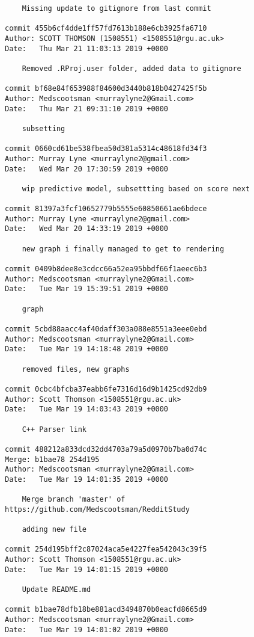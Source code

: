 \begin{lstlisting}
    Missing update to gitignore from last commit

commit 455b6cf4dde1ff57fd7613b188e6cb3925fa6710
Author: SCOTT THOMSON (1508551) <1508551@rgu.ac.uk>
Date:   Thu Mar 21 11:03:13 2019 +0000

    Removed .RProj.user folder, added data to gitignore

commit bf68e84f653988f84600d3440b818b0427425f5b
Author: Medscootsman <murraylyne2@Gmail.com>
Date:   Thu Mar 21 09:31:10 2019 +0000

    subsetting

commit 0660cd61be538fbea50d381a5314c48618fd34f3
Author: Murray Lyne <murraylyne2@gmail.com>
Date:   Wed Mar 20 17:30:59 2019 +0000

    wip predictive model, subsettting based on score next

commit 81397a3fcf10652779b5555e60850661ae6bdece
Author: Murray Lyne <murraylyne2@gmail.com>
Date:   Wed Mar 20 14:33:19 2019 +0000

    new graph i finally managed to get to rendering

commit 0409b8dee8e3cdcc66a52ea95bbdf66f1aeec6b3
Author: Medscootsman <murraylyne2@Gmail.com>
Date:   Tue Mar 19 15:39:51 2019 +0000

    graph

commit 5cbd88aacc4af40daff303a088e8551a3eee0ebd
Author: Medscootsman <murraylyne2@Gmail.com>
Date:   Tue Mar 19 14:18:48 2019 +0000

    removed files, new graphs

commit 0cbc4bfcba37eabb6fe7316d16d9b1425cd92db9
Author: Scott Thomson <1508551@rgu.ac.uk>
Date:   Tue Mar 19 14:03:43 2019 +0000

    C++ Parser link

commit 488212a833dcd32dd4703a79a5d0970b7ba0d74c
Merge: b1bae78 254d195
Author: Medscootsman <murraylyne2@Gmail.com>
Date:   Tue Mar 19 14:01:35 2019 +0000

    Merge branch 'master' of https://github.com/Medscootsman/RedditStudy
    
    adding new file

commit 254d195bff2c87024aca5e4227fea542043c39f5
Author: Scott Thomson <1508551@rgu.ac.uk>
Date:   Tue Mar 19 14:01:15 2019 +0000

    Update README.md

commit b1bae78dfb18be881acd3494870b0eacfd8665d9
Author: Medscootsman <murraylyne2@Gmail.com>
Date:   Tue Mar 19 14:01:02 2019 +0000


\end{lstlisting}
